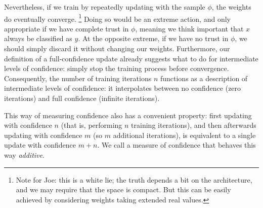 \begin{example}
Nevertheless, 
if we train by repeatedly updating with the sample $\phi$, 
the weights do eventually converge.%
	\footnote{Note for Joe: this is a white lie; the truth depends a bit on the architecture, and we may require that the space is compact. But this can be easily achieved by considering weights taking extended real values.}
Doing so would be an extreme action, and only appropriate if we have complete trust in $\phi$, meaning we think important that $x$ always be classified as $y$.
At the opposite extreme, if we have no trust in $\phi$, we should simply discard it without changing our weights. 
Furthermore, our definition of a full-confidence update 
already suggests what to do for intermediate levels of confidence: simply stop the training process before convergence.
Consequently, the number of training iterations $n$ 
functions as a description of 
intermediate levels of confidence: it interpolates
between no confidence (zero iterations) and full confidence (infinite iterations).

	This way of measuring confidence also has a convenient property:
	first updating with confidence $n$ (that is, performing $n$ training iterations),
	and then afterwards updating with confidence $m$ (so $m$ additional iterations),
	is equivalent to a single update with confidence $m+n$.
	We call a measure of confidence that behaves this way \emph{additive}.
\end{example}

